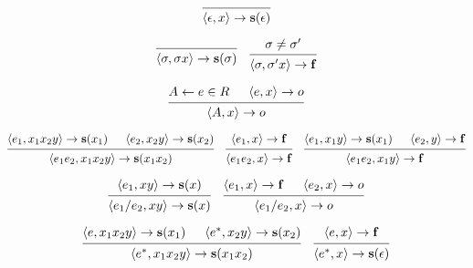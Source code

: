 \documentclass[12pt]{article}
\begin{document}
\pagestyle{empty}

\[
  \begin{prooftree}
    \infer0{\langle \epsilon, x\rangle \to \mathbf{s}(\epsilon)}
  \end{prooftree}
\]

\[
  \begin{prooftree}
    \infer0{\langle \sigma,\sigma x\rangle \to \mathbf{s}(\sigma)}
  \end{prooftree}
  \quad
  \begin{prooftree}
    \hypo{\sigma \neq \sigma'}
    \infer1{\langle \sigma,\sigma' x\rangle \to \mathbf{f}}
  \end{prooftree}
\]

\[
  \begin{prooftree}
    \hypo{A \leftarrow e \in R}
    \hypo{\langle e, x\rangle \to o}
    \infer2{\langle A, x\rangle \to o}
  \end{prooftree}
\]

\[
  \begin{prooftree}
    \hypo{\langle e_1,x_1x_2y\rangle\to \mathbf{s}(x_1)}
    \hypo{\langle e_2, x_2y\rangle \to \mathbf{s}(x_2)}
    \infer2{\langle e_1e_2, x_1x_2y\rangle \to \mathbf{s}(x_1x_2)}
  \end{prooftree}
  \quad
  \begin{prooftree}
    \hypo{\langle e_1,x\rangle \to \mathbf{f}}
    \infer1{\langle e_1e_2, x\rangle \to \mathbf{f}}
  \end{prooftree}
  \quad
  \begin{prooftree}
    \hypo{\langle e_1,x_1y\rangle\to \mathbf{s}(x_1)}
    \hypo{\langle e_2, y\rangle \to \mathbf{f}}
    \infer2{\langle e_1e_2, x_1y\rangle \to \mathbf{f}}
  \end{prooftree}
\]

\[
  \begin{prooftree}
    \hypo{\langle e_1,xy\rangle \to \mathbf{s}(x)}
    \infer1{\langle e_1 / e_2,xy\rangle \to \mathbf{s}(x)}
  \end{prooftree}
  \quad
  \begin{prooftree}
    \hypo{\langle e_1,x\rangle \to \mathbf{f}}
    \hypo{\langle e_2,x\rangle \to o}
    \infer2{\langle e_1 / e_2,x\rangle \to o}
  \end{prooftree}
\]

\[
  \begin{prooftree}
    \hypo{\langle e,x_1x_2y\rangle \to \mathbf{s}(x_1)}
    \hypo{\langle e^*,x_2y\rangle \to \mathbf{s}(x_2)}
    \infer2{\langle e^*,x_1x_2y\rangle \to \mathbf{s}(x_1x_2)}
  \end{prooftree}
  \quad
  \begin{prooftree}
    \hypo{\langle e,x\rangle \to \mathbf{f}}
    \infer1{\langle e^*,x\rangle \to \mathbf{s}(\epsilon)}
  \end{prooftree}
\]
\end{document}
